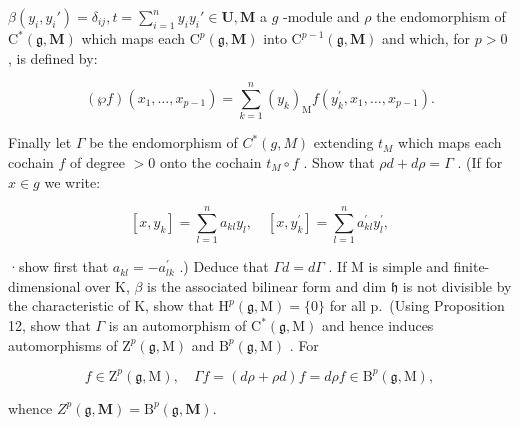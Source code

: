  \(\beta(y_i, y_i') = \delta_{ij}, t = \sum_{i=1}^{n} y_i y_i' \in \mathbf{U}, \mathbf{M}\) a \(g\) -module and \(\rho\) the endomorphism of \(\mathrm{C}^*(\mathfrak{g}, \mathbf{M})\) which maps each \(\mathrm{C}^p(\mathfrak{g}, \mathbf{M})\) into \(\mathrm{C}^{p-1}(\mathfrak{g}, \mathbf{M})\) and which, for \(p > 0\) , is defined by:

\[
(\wp f) (x _ {1}, \dots , x _ {p - 1}) = \sum_ {k = 1} ^ {n} (y _ {k}) _ {\mathrm{M}} f (y _ {k} ^ {\prime}, x _ {1}, \dots , x _ {p - 1}).
\]

Finally let \(\Gamma\) be the endomorphism of \(C^*(g, M)\) extending \(t_M\) which maps each cochain \(f\) of degree \(>0\) onto the cochain \(t_M \circ f\) . Show that \(\rho d + d\rho = \Gamma\) . (If for \(x \in g\) we write:

\[
[ x, y _ {k} ] = \sum_ {l = 1} ^ {n} a _ {k l} y _ {l}, \quad [ x, y _ {k} ^ {\prime} ] = \sum_ {l = 1} ^ {n} a _ {k l} ^ {\prime} y _ {l} ^ {\prime},
\]

·show first that \(a_{kl} = -a_{lk}^{\prime}\) .) Deduce that \(\Gamma d = d\Gamma\) . If M is simple and finite-dimensional over K, \(\beta\) is the associated bilinear form and dim \(\mathfrak{h}\) is not divisible by the characteristic of K, show that \(\mathrm{H}^{p}(\mathfrak{g},\mathrm{M})=\{0\}\) for all p.~(Using Proposition 12, show that \(\Gamma\) is an automorphism of \(\mathrm{C}^{*}(\mathfrak{g},\mathrm{M})\) and hence induces automorphisms of \(\mathrm{Z}^{p}(\mathfrak{g},\mathrm{M})\) and \(\mathrm{B}^{p}(\mathfrak{g},\mathrm{M})\) . For

\[
f \in \mathrm{Z} ^ {p} (\mathfrak {g}, \mathrm{M}), \quad \Gamma f = (d \rho + \rho d) f = d \rho f \in \mathrm{B} ^ {p} (\mathfrak {g}, \mathrm{M}),
\]

whence \(Z^{p}(\mathfrak{g},\mathbf{M}) = \mathrm{B}^{p}(\mathfrak{g},\mathbf{M}).\)

